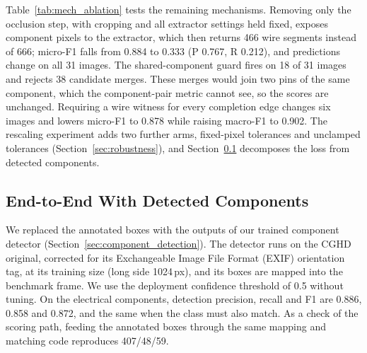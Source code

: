 \documentclass[journal]{IEEEtran}
\begin{document}
Table~\ref{tab:mech_ablation} tests the remaining mechanisms. Removing only the occlusion step, with cropping and all extractor settings held fixed, exposes component pixels to the extractor, which then returns 466 wire segments instead of 666; micro-F1 falls from 0.884 to 0.333 (P 0.767, R 0.212), and predictions change on all 31 images. The shared-component guard fires on 18 of 31 images and rejects 38 candidate merges. These merges would join two pins of the same component, which the component-pair metric cannot see, so the scores are unchanged. Requiring a wire witness for every completion edge changes six images and lowers micro-F1 to 0.878 while raising macro-F1 to 0.902. The rescaling experiment adds two further arms, fixed-pixel tolerances and unclamped tolerances (Section~\ref{sec:robustness}), and Section~\ref{sec:e2e} decomposes the loss from detected components.

\subsection{End-to-End With Detected Components}
\label{sec:e2e}

We replaced the annotated boxes with the outputs of our trained component detector (Section~\ref{sec:component_detection}). The detector runs on the CGHD original, corrected for its Exchangeable Image File Format (EXIF) orientation tag, at its training size (long side 1024\,px), and its boxes are mapped into the benchmark frame. We use the deployment confidence threshold of 0.5 without tuning. On the electrical components, detection precision, recall and F1 are 0.886, 0.858 and 0.872, and the same when the class must also match. As a check of the scoring path, feeding the annotated boxes through the same mapping and matching code reproduces 407/48/59.
\end{document}

